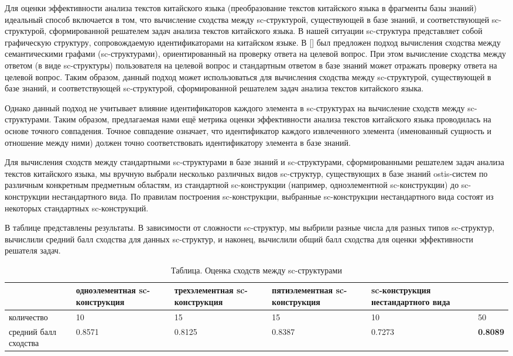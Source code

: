 Для оценки эффективности анализа текстов китайского языка (преобразование текстов китайского языка в фрагменты базы знаний) идеальный способ включается в том, что вычисление сходства между sc-структурой, существующей в базе знаний, и соответствующей sc-структурой, сформированной решателем задач анализа текстов китайского языка. В нашей ситуации sc-структура представляет собой графическую структуру, сопровождаемую идентификаторами на китайском языке. В [] был предложен подход вычисления сходства между семантическими графами (sc-структурами), ориентированный на проверку ответа на целевой вопрос. При этом вычисление сходства между ответом (в виде sc-структуры) пользователя на целевой вопрос и стандартным ответом в базе знаний может отражать проверку ответа на целевой вопрос. Таким образом, данный подход может использоваться для вычисления сходства между sc-структурой, существующей в базе знаний, и соответствующей sc-структурой, сформированной решателем задач анализа текстов китайского языка. 

Однако данный подход не учитывает влияние идентификаторов каждого элемента в sc-структурах на вычисление сходств между sc-структурами. Таким образом, предлагаемая нами ещё метрика оценки эффективности анализа текстов китайского языка проводилась на основе точного совпадения. Точное совпадение означает, что идентификатор каждого извлеченного элемента (именованный сущность и отношение между ними) должен точно соответствовать идентификатору элемента в базе знаний. 

Для вычисления сходств между стандартными sc-структурами в базе знаний и sc-структурами, сформированными решателем задач анализа текстов китайского языка, мы вручную выбрали несколько различных видов sc-структур, существующих в базе знаний ostis-систем по различным конкретным предметным областям, из стандартной sc-конструкции (например, одноэлементной sc-конструкции) до sc-конструкции нестандартного вида. По правилам построения sc-конструкции, выбранные sc-конструкции нестандартного вида состоят из некоторых стандартных sc-конструкций.

В таблице \textit{} представлены результаты. В зависимости от сложности sc-структур, мы выбрили разные числа для разных типов sc-структур, вычислили средний балл сходства для данных sc-структур, и наконец, вычислили общий балл сходства для оценки эффективности решателя задач.
\renewcommand\arraystretch{2}
\begin{table}[]
	\caption{Таблица. Оценка сходств между sc-структурами}
	\centering
	\begin{tabular}{|m{8em}|m{8em}|m{8em}|m{8em}|m{8em}|m{8em}|}
		\hline
		{}
		& одноэлементная sc-конструкция
		& трехэлементная sc-конструкция
		& пятиэлементная sc-конструкция
		& sc-конструкция нестандартного вида
		& \makecell[c]{общее} \\
		\hline 
		количество
		& 10
		& 15
		& 15
		& 10
		& 50 \\
		\hline
		средний балл сходства
		& 0.8571
		& 0.8125
		& 0.8387
		& 0.7273
		& \textbf{0.8089} \\
		\hline
	\end{tabular}
	\label{table:sc-structure-generation}
\end{table}

